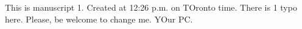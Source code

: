 This is manuscript 1. Created at 12:26 p.m. on TOronto time. There is 1 typo here. Please, be welcome to change me. YOur PC.
